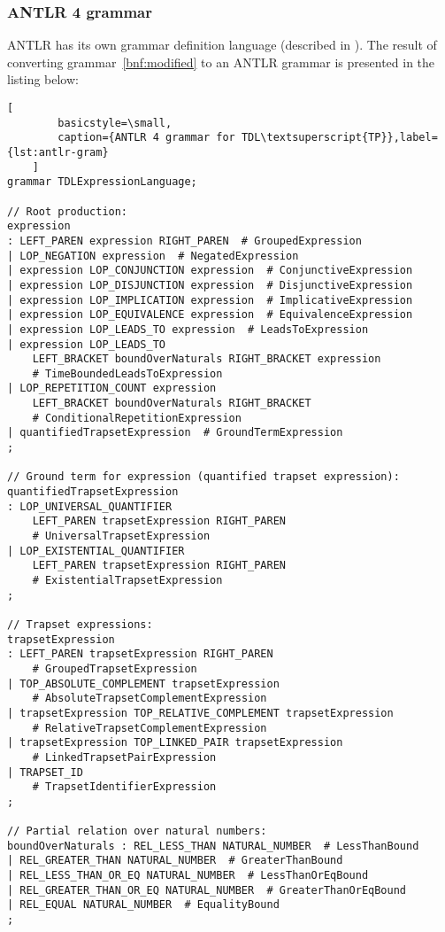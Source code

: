 \documentclass[12pt,oneside,a4paper,notitlepage]{report}
\begin{document}
	\subsubsection*{ANTLR 4 grammar}
	\par ANTLR has its own grammar definition language (described in \cite{antlrtutorial}). The result of converting grammar~\ref{bnf:modified} to an ANTLR  grammar is presented in the listing below:
	
	\begin{lstlisting}[
		basicstyle=\small,
		caption={ANTLR 4 grammar for TDL\textsuperscript{TP}},label={lst:antlr-gram}
	]
grammar TDLExpressionLanguage;

// Root production:
expression
: LEFT_PAREN expression RIGHT_PAREN  # GroupedExpression
| LOP_NEGATION expression  # NegatedExpression
| expression LOP_CONJUNCTION expression  # ConjunctiveExpression
| expression LOP_DISJUNCTION expression  # DisjunctiveExpression
| expression LOP_IMPLICATION expression  # ImplicativeExpression
| expression LOP_EQUIVALENCE expression  # EquivalenceExpression
| expression LOP_LEADS_TO expression  # LeadsToExpression
| expression LOP_LEADS_TO
	LEFT_BRACKET boundOverNaturals RIGHT_BRACKET expression 
	# TimeBoundedLeadsToExpression
| LOP_REPETITION_COUNT expression
	LEFT_BRACKET boundOverNaturals RIGHT_BRACKET 
	# ConditionalRepetitionExpression
| quantifiedTrapsetExpression  # GroundTermExpression
;

// Ground term for expression (quantified trapset expression):
quantifiedTrapsetExpression
: LOP_UNIVERSAL_QUANTIFIER
	LEFT_PAREN trapsetExpression RIGHT_PAREN
	# UniversalTrapsetExpression
| LOP_EXISTENTIAL_QUANTIFIER
	LEFT_PAREN trapsetExpression RIGHT_PAREN
	# ExistentialTrapsetExpression
;

// Trapset expressions:
trapsetExpression
: LEFT_PAREN trapsetExpression RIGHT_PAREN
	# GroupedTrapsetExpression
| TOP_ABSOLUTE_COMPLEMENT trapsetExpression
	# AbsoluteTrapsetComplementExpression
| trapsetExpression TOP_RELATIVE_COMPLEMENT trapsetExpression
	# RelativeTrapsetComplementExpression
| trapsetExpression TOP_LINKED_PAIR trapsetExpression
	# LinkedTrapsetPairExpression
| TRAPSET_ID
	# TrapsetIdentifierExpression
;

// Partial relation over natural numbers:
boundOverNaturals : REL_LESS_THAN NATURAL_NUMBER  # LessThanBound
| REL_GREATER_THAN NATURAL_NUMBER  # GreaterThanBound
| REL_LESS_THAN_OR_EQ NATURAL_NUMBER  # LessThanOrEqBound
| REL_GREATER_THAN_OR_EQ NATURAL_NUMBER  # GreaterThanOrEqBound
| REL_EQUAL NATURAL_NUMBER  # EqualityBound
;


\end{lstlisting}
\end{document}
